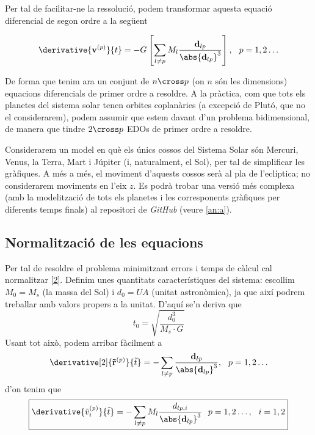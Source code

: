 \documentclass[10pt, twoside, a4paper]{article}
\begin{document}
Per tal de facilitar-ne la ressolució, podem transformar aquesta equació diferencial de segon ordre a la següent

\begin{equation}
    \derivative{\mathbf{v}^{(p)}}{t} = -G \left[ \sum_{l \neq p} M_l\frac{\mathbf{d}_{lp}}{\abs{\mathbf{d}_{lp}}^3}\right], \hspace{0.25cm} p = 1,2 \ldots \label{2}
\end{equation}

De forma que tenim ara un conjunt de $n \cross p$ (on $n$ són les dimensions) equacions diferencials de primer ordre a resoldre. A la pràctica, com que tots els planetes del sistema solar tenen orbites coplanàries (a excepció de Plutó, que no el considerarem), podem assumir que estem davant d'un problema bidimensional, de manera que tindre $2 \cross p$ EDOs de primer ordre a resoldre.

Considerarem un model en què els únics cossos del Sistema Solar són Mercuri, Venus, la Terra, Mart i Júpiter (i, naturalment, el Sol), per tal de simplificar les gràfiques. A més a més, el moviment d'aquests cossos serà al pla de l'eclíptica; no considerarem moviments en l'eix $z$. Es podrà trobar una versió més complexa (amb la modelització de tots els planetes i les corresponents gràfiques per diferents temps finals) al repositori de \textit{GitHub} (veure \ref{an:a}). 

\subsection{Normalització de les equacions}
Per tal de resoldre el problema minimitzant errors i temps de càlcul cal normalitzar \eqref{2}. Definim unes quantitats característiques del sistema: escollim $M_0 = M_s$ (la massa del Sol) i $d_0 = UA$ (unitat astronòmica), ja que així podrem treballar amb valors propers a la unitat. D'aquí se'n deriva que
\begin{equation*}
    t_0 = \sqrt{\frac{d_0^3}{M_s \cdot G}}
\end{equation*}
Usant tot això, podem arribar fàcilment a 
\begin{equation}
    \derivative[2]{\mathbf{\tilde{r}}^{(p)}}{\tilde{t}} = - \sum_{l \neq p} \frac{\mathbf{d}_{lp}}{\abs{\mathbf{d}_{lp}}^3}, \hspace{0.25cm} p = 1,2 \ldots
\end{equation}
d'on tenim que
\begin{equation}
    \boxed{\derivative{\tilde{v}_i^{(p)}}{\tilde{t}} = - \sum_{l \neq p} M_l \frac{d_{lp,i}}{\abs{\mathbf{d}_{lp}}^3} \hspace{0.25cm} p = 1,2 \ldots, \hspace{0.25cm} i = 1, 2} \label{eq5}
\end{equation}
\end{document}
